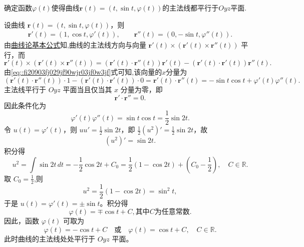 \documentclass[../../main.tex]{subfiles}%
\begin{document}
\begin{example}
确定函数$\varphi(t)$使得曲线$\bm{r}(t) = (t, \sin t, \varphi(t))$的主法线都平行于$Oyz$平面.
\end{example}
\begin{solution}

设曲线 $\bm{r}(t) = (t, \sin t, \varphi(t))$，则
\begin{align}
\bm{r}'(t) = (1, \cos t, \varphi'(t)), \qquad 
\bm{r}''(t) = (0, -\sin t, \varphi''(t)).\label{eq::fi20903fj029jf90wjr03jf0w3jf}
\end{align}
由\hyperref[theorem:曲线论基本公式]{曲线论基本公式}知,曲线的主法线方向与向量 $\bm{r}'(t) \times (\bm{r}'(t) \times \bm{r}''(t))$ 平行，而
\[
\bm{r}'(t) \times (\bm{r}'(t) \times \bm{r}''(t)) = (\bm{r}'(t)\cdot\bm{r}''(t))\bm{r}'(t) - (\bm{r}'(t)\cdot\bm{r}'(t))\bm{r}''(t).
\]
由\eqref{eq::fi20903fj029jf90wjr03jf0w3jf}式可知,该向量的$x$分量为
\[
(\bm{r}'(t)\cdot\bm{r}''(t)) \cdot 1 - (\bm{r}'(t)\cdot\bm{r}'(t)) \cdot 0 = \bm{r}'(t)\cdot\bm{r}''(t)= -\sin t\cos t + \varphi'(t)\varphi''(t).
\]
主法线平行于 $Oyz$ 平面当且仅当其 $x$ 分量为零，即
\[
\bm{r}'\cdot\bm{r}'' = 0.
\]
因此条件化为
\[
\varphi'(t)\varphi''(t) = \sin t\cos t = \frac{1}{2}\sin 2t.
\]
令 $u(t) = \varphi'(t)$，则 $u u' = \frac{1}{2}\sin 2t$，即 $\frac{1}{2}(u^2)' = \frac{1}{2}\sin 2t$，故
\[
(u^2)' = \sin 2t.
\]
积分得
\[
u^2 = \int \sin 2t\,dt = -\frac{1}{2}\cos 2t + C_0 = \frac{1}{2}(1 - \cos 2t) + \left(C_0 - \frac{1}{2}\right),\quad C\in \mathbb{R}.
\]
取 $C_0 = \frac{1}{2}$,则
\[
u^2 = \frac{1}{2}(1 - \cos 2t) = \sin^2 t,
\]
于是 $u(t) = \varphi'(t) = \pm \sin t$。积分得
\[
\varphi(t) = \mp \cos t + C,\text{其中}C\text{为任意常数}.
\]
因此，函数 $\varphi(t)$ 可取为
\[
\varphi(t) = -\cos t + C \quad\text{或}\quad \varphi(t) = \cos t + C,\quad C\in\mathbb{R}.
\]
此时曲线的主法线处处平行于 $Oyz$ 平面。

\end{solution}
\end{document}
